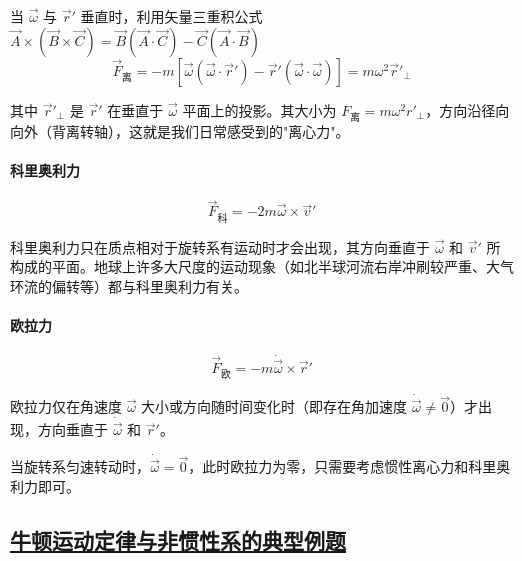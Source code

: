 当 $\vec{\omega}$ 与 $\vec{r}'$ 垂直时，利用矢量三重积公式 $\vec{A}\times(\vec{B}\times\vec{C}) = \vec{B}(\vec{A}\cdot\vec{C}) - \vec{C}(\vec{A}\cdot\vec{B})$
\begin{equation}
    \vec{F}_{\text{离}} = -m[\vec{\omega}(\vec{\omega}\cdot\vec{r}') - \vec{r}'(\vec{\omega}\cdot\vec{\omega})] = m\omega^2\vec{r}'_{\perp}
\end{equation}

其中 $\vec{r}'_{\perp}$ 是 $\vec{r}'$ 在垂直于 $\vec{\omega}$ 平面上的投影。其大小为 $F_{\text{离}} = m\omega^2 r'_{\perp}$，方向沿径向向外（背离转轴），这就是我们日常感受到的"离心力"。

\paragraph*{科里奥利力}
\begin{equation}
    \vec{F}_{\text{科}} = -2m\vec{\omega} \times \vec{v}'
\end{equation}

科里奥利力只在质点相对于旋转系有运动时才会出现，其方向垂直于 $\vec{\omega}$ 和 $\vec{v}'$ 所构成的平面。地球上许多大尺度的运动现象（如北半球河流右岸冲刷较严重、大气环流的偏转等）都与科里奥利力有关。

\paragraph*{欧拉力}
\begin{equation}
    \vec{F}_{\text{欧}} = -m\dot{\vec{\omega}} \times \vec{r}'
\end{equation}

欧拉力仅在角速度 $\vec{\omega}$ 大小或方向随时间变化时（即存在角加速度 $\dot{\vec{\omega}} \neq \vec{0}$）才出现，方向垂直于 $\dot{\vec{\omega}}$ 和 $\vec{r}'$。

\begin{remark}
    当旋转系匀速转动时，$\dot{\vec{\omega}} = \vec{0}$，此时欧拉力为零，只需要考虑惯性离心力和科里奥利力即可。
\end{remark}

\subsection{\protect\hyperlink{:}{牛顿运动定律与非惯性系的典型例题}}


